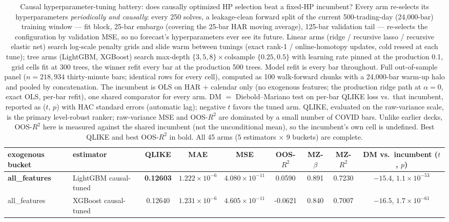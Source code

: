 \begin{table}[t]
\centering
\caption{Causal hyperparameter-tuning battery: does causally optimized HP selection beat
a fixed-HP incumbent? Every arm re-selects its hyperparameters \emph{periodically and
causally}: every 250 solves, a leakage-clean forward split of the current 500-trading-day
(24{,}000-bar) training window --- fit block, 25-bar embargo (covering the 25-bar HAR moving
average), 125-bar validation tail --- re-selects the configuration by validation MSE, so no
forecast's hyperparameters ever see its future. Linear arms (ridge / recursive lasso /
recursive elastic net) search log-scale penalty grids and slide warm between tunings
(exact rank-1 / online-homotopy updates, cold reseed at each tune); tree arms (LightGBM,
XGBoost) search max-depth $\{3,5,8\}\times$colsample $\{0.25,0.5\}$ with learning rate
pinned at the production 0.1, grid cells fit at 300 trees, the winner refit every bar at
the production 500 trees. Model refit is every bar throughout. Full out-of-sample panel
($n = 218{,}934$ thirty-minute bars; identical rows for every
cell), computed as 100 walk-forward chunks with a 24{,}000-bar warm-up halo and pooled by
concatenation. The incumbent is OLS on HAR $+$ calendar only (no exogenous features; the
production ridge path at $\alpha = 0$, exact OLS, per-bar refit), one shared comparator
for every arm. DM $=$ Diebold--Mariano test on per-bar QLIKE loss vs.\ that incumbent,
reported as ($t$, $p$) with HAC standard errors (automatic lag); negative $t$ favors the
tuned arm. QLIKE, evaluated on the raw-variance scale, is the primary level-robust ranker;
raw-variance MSE and OOS-$R^2$ are dominated by a small number of COVID bars. Unlike
earlier decks, OOS-$R^2$ here is measured against the shared incumbent (not the
unconditional mean), so the incumbent's own cell is undefined. Best QLIKE and best
OOS-$R^2$ in bold. All 45 arms (5 estimators $\times$ 9 buckets) are complete.}
\vspace{4pt}
\footnotesize
\setlength{\tabcolsep}{4pt}
\begin{tabular}{@{}llccccccc@{}}
\toprule
exogenous bucket & estimator & QLIKE & MAE & MSE & OOS-$R^2$ & MZ-$\beta$ & MZ-$R^2$ & DM vs.\ incumbent ($t$, $p$) \\
\midrule
\textbf{all\_features} & LightGBM causal-tuned & \textbf{0.12603} & $1.222 \times 10^{-6}$ & $4.080 \times 10^{-11}$ & 0.0590 & 0.891 & 0.7230 & $-15.4$, $1.1 \times 10^{-53}$ \\
all\_features & XGBoost causal-tuned & 0.12640 & $1.231 \times 10^{-6}$ & $4.605 \times 10^{-11}$ & -0.0621 & 0.840 & 0.7007 & $-16.5$, $1.7 \times 10^{-61}$ \\

\end{tabular}
\end{table}
